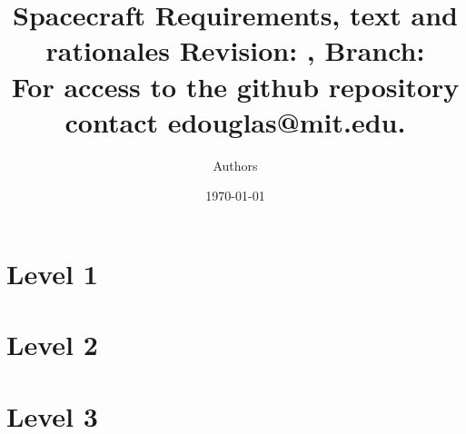 \documentclass[9pt]{beamer}
\title{ Spacecraft Requirements, text and rationales
  \tiny{Revision: \gitDescribe, Branch: \gitBranch\\
    For access to the github repository contact edouglas@mit.edu.}}
\author{Authors}
\date{\today}
\begin{document}

\frame{\titlepage}

\section[Outline]{}
\section{Level 1}

\section{Level 2}

\section{Level 3}

\end{document}
